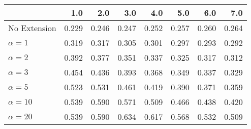 \begin{tabular}{lrrrrrrr}
\toprule
{} &   1.0 &   2.0 &   3.0 &   4.0 &   5.0 &   6.0 &   7.0 \\
\midrule
No Extension  & 0.229 & 0.246 & 0.247 & 0.252 & 0.257 & 0.260 & 0.264 \\
$\alpha = 1$  & 0.319 & 0.317 & 0.305 & 0.301 & 0.297 & 0.293 & 0.292 \\
$\alpha = 2$  & 0.392 & 0.377 & 0.351 & 0.337 & 0.325 & 0.317 & 0.312 \\
$\alpha = 3$  & 0.454 & 0.436 & 0.393 & 0.368 & 0.349 & 0.337 & 0.329 \\
$\alpha = 5$  & 0.523 & 0.531 & 0.461 & 0.419 & 0.390 & 0.371 & 0.359 \\
$\alpha = 10$ & 0.539 & 0.590 & 0.571 & 0.509 & 0.466 & 0.438 & 0.420 \\
$\alpha = 20$ & 0.539 & 0.590 & 0.634 & 0.617 & 0.568 & 0.532 & 0.509 \\
\bottomrule
\end{tabular}
